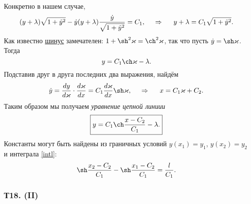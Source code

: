 Конкретно в нашем случае,
\begin{equation*}
    (y+\lambda) \sqrt{1 + \dot{y}^2}
    - \dot{y} (y + \lambda) \frac{\dot{y}}{\sqrt{1+\dot{y}^2}}  = C_1,
    \hspace{0.5cm} \Rightarrow \hspace{0.5cm} 
    y + \lambda = C_1 \sqrt{1 + \dot{y}^2}.
\end{equation*}
Как известно 
\href{https://ru.wikipedia.org/wiki/%D0%A8%D0%B8%D0%BD%D1%83%D1%81}{шинус} замечателен: $1 + \sh^2 \varkappa = \ch^2 \varkappa$, так что пусть $\dot{y} = \sh \varkappa$. Тогда
\begin{equation*}
    y = C_1 \ch \varkappa - \lambda.
\end{equation*}
Подставив друг в друга последних два выражения, найдём
\begin{equation*}
    \dot{y} = \frac{d y}{d \varkappa} \cdot \frac{d \varkappa}{d x} 
    = C_1 \frac{d \varkappa}{d x} 
    \sh \varkappa,
    \hspace{0.5cm} \Rightarrow \hspace{0.5cm} 
    x  = C_1 \varkappa + C_2.
\end{equation*}
Таким образом мы получаем \textit{уравнение цепной линиии}
\begin{equation}
    \boxed{
        y = C_1 \ch \frac{x-C_2}{C_1} - \lambda.
    }
\end{equation}
Константы могут быть найдены из граничных условий $y(x_1)=y_1$, $y(x_2)=y_2$
и интеграла \eqref{intl}:
\begin{equation*}
     \sh \frac{x_2 - C_2}{C_1} - \sh \frac{x_1 - C_2}{C_1} = \frac{l}{C_1}.
\end{equation*} 




\subsubsection*{Т18. (II)}

